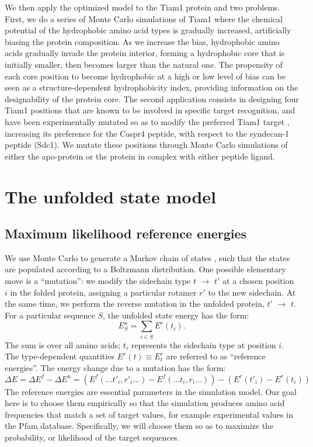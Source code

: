 \documentclass[12pt]{article}
\begin{document}
We then apply the optimized model to the Tiam1 protein and two problems. First, we do a series of Monte Carlo simulations of
Tiam1 where the chemical potential of the hydrophobic amino acid types is gradually increased, artificially biasing the protein
composition. As we increase the bias, hydrophobic amino acids gradually invade the protein interior, forming a hydrophobic core
that is initially smaller, then becomes larger than the natural one. The propensity of each core position to become hydrophobic
at a high or low level of bias can be seen as a structure-dependent hydrophobicity index, providing information on the designability
of the protein core. The second application consists in designing four Tiam1 positions that are known to be involved in specific
target recognition, and have been experimentally mutated so as to modify the preferred Tiam1 target \cite{Sheperd11}, increasing
its preference for the Caspr4 peptide, with respect to the syndecan-1 peptide (Sdc1). We mutate these positions through Monte
Carlo simulations of either the apo-protein or the protein in complex with either peptide ligand. 

\section{The unfolded state model}
\subsection{Maximum likelihood reference energies}
We use Monte Carlo to generate a Markov chain of states \cite{FrenkelBK3,GrimmetBK}, such that the states
are populated according to a Boltzmann distribution. One possible elementary move is a ``mutation'': we modify
the sidechain type $t$ $\rightarrow$ $t'$ at a chosen position $i$ in the folded protein, assigning a particular
rotamer $r'$ to the new sidechain. At the same time, we perform the reverse mutation in the unfolded protein,
$t'$ $\rightarrow$ $t$. For a particular sequence $S$, the unfolded state energy has the form:
\begin{equation} \label{eq:unfolded}
E^u_S = \sum_{i \in S} E^r(t_i).
\end{equation}
The sum is over all amino acids; $t_i$ represents the sidechain type at position $i$.  The type-dependent quantities
$E^r(t) \equiv E^r_t$ are referred to as ``reference energies''. The energy change due to a mutation has the form:
\begin{equation}  \label{eq:deltaE}
\Delta E = \Delta E^f - \Delta E^u =
\left( E^f(... t'_i,r'_i ...) - E^f(... t_i,r_i ...) \right) - \left( E^r(t'_i) - E^r(t_i) \right)
\end{equation}
The reference energies are essential parameters in the simulation model. Our goal here is to choose them empirically
so that the simulation produces amino acid frequencies that match a set of target values, for example experimental
values in the Pfam database. Specifically, we will choose them so as to maximize the probability, or likelihood of
the target sequences.
\end{document}
